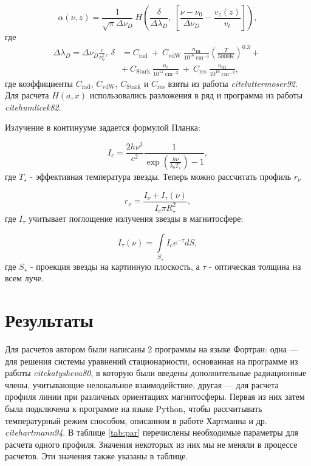 \documentclass{article}
\begin{document}
\begin{equation} \label{eq:profabsfoigt}
\alpha(\nu, z) = \frac{1}{\sqrt{\pi} \Delta\nu_D}\ H\left(\frac{\delta}{\Delta\lambda_D},\ \left[ \frac{\nu - \nu_0}{\Delta\nu_D} - \frac{v_z(z)}{v_t}\right]\right),
\end{equation}
где 
\begin{align} \label{eq:foigtcoef}
\Delta\lambda_D = \Delta\nu_D\frac{c}{\nu_0^2},\ \delta & = C_{\text{rad}}\ + \ 
 C_{\text{vdW}}\ \frac{n_{\text{HI}}}{10^{16}\ \text{cm}^{-3}}\left(\frac{T}{5000 \text{K}}\right)^{0.3} +\ \nonumber \\
 &+\ C_{\text{Stark}}\ \frac{n_e}{10^{12}\ \text{cm}^{-3}}\ + \ C_{\text{res}}\ \frac{n_\text{HI}}{10^{16}\ \text{cm}^{-3}},
\end{align}
где коэффициенты $C_\text{rad}$, $C_\text{vdW}$, $C_\text{Stark}$ и $C_\text{res}$ взяты из работы \textit{cite{luttermoser92}}. Для расчета $H(a, x)$ использовались разложения в ряд и программа из работы \textit{cite{humlicek82}}.

Излучение в континууме задается формулой Планка:

\begin{equation} \label{eq:profcont}
I_c = \frac{2h\nu^3}{c^2}\frac{1}{\exp\left(\frac{h\nu}{k_bT_\star}\right)-1},
\end{equation}
где $T_\star$ - эффективная температура звезды. Теперь можно рассчитать профиль $r_{\nu}$

\begin{equation} \label{eq:profnorm}
r_{\nu} = \frac{I_\nu + I_{\tau}(\nu)}{I_c \pi R_\star^2},
\end{equation}
где $I_{\tau}$ учитывает поглощение излучения звезды в магнитосфере:

\begin{equation} \label{eq:absorbprof}
I_{\tau}(\nu) = \int \limits_{S_\star} I_c e^{-\tau} dS,
\end{equation}
где $S_\star$ - проекция звезды на картинную плоскость, а $\tau$ - оптическая толщина на всем луче.

\section{Результаты}
Для расчетов автором были написаны 2 программы на языке Фортран: одна --- для решения системы уравнений стационарности, основанная на программе из работы \textit{cite{katysheva80}}, в которую были введены дополнительные радиационные члены, учитывающие нелокальное взаимодействие, другая --- для расчета профиля линии при различных ориентациях магнитосферы. Первая из них затем была подключена к программе на языке Python, чтобы рассчитывать температурный режим способом, описанном в работе Хартманна и др. \textit{cite{hartmann94}}. В таблице \ref{tab:par} перечислены необходимые параметры для расчета одного профиля. Значения некоторых из них мы не меняли в процессе расчетов. Эти значения также указаны в таблице.
\end{document}
